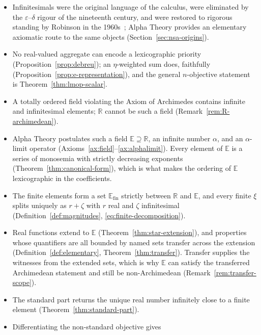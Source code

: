 \begin{itemize}
  \item Infinitesimals were the original language of the calculus, were eliminated by
        the $\varepsilon$--$\delta$ rigour of the nineteenth century, and were
        restored to rigorous standing by Robinson in the
        1960s~\cite{robinson1996nonstandard}; Alpha Theory provides an elementary
        axiomatic route to the same objects
        (Section~\ref{sec:nsa-origins}).
  \item No real-valued aggregate can encode a lexicographic priority
        (Proposition~\ref{prop:debreu}); an $\eta$-weighted sum does, faithfully
        (Proposition~\ref{prop:e-representation}), and the general $n$-objective
        statement is Theorem~\ref{thm:lmop-scalar}.
  \item A totally ordered field violating the Axiom of Archimedes contains infinite
        and infinitesimal elements; $\mathbb{R}$ cannot be such a field
        (Remark~\ref{rem:R-archimedean}).
  \item Alpha Theory postulates such a field $\mathbb{E} \supseteq \mathbb{R}$, an
        infinite number $\alpha$, and an $\alpha$-limit operator
        (Axioms~\ref{ax:field}--\ref{ax:alphalimit}). Every element of $\mathbb{E}$
        is a series of monosemia with strictly decreasing exponents
        (Theorem~\ref{thm:canonical-form}), which is what makes the ordering of
        $\mathbb{E}$ lexicographic in the coefficients.
  \item The finite elements form a set $\mathbb{E}_{\mathrm{fin}}$ strictly between
        $\mathbb{R}$ and $\mathbb{E}$, and every finite $\xi$ splits uniquely as
        $r+\zeta$ with $r$ real and $\zeta$ infinitesimal
        (Definition~\ref{def:magnitudes}, \eqref{eq:finite-decomposition}).
  \item Real functions extend to $\mathbb{E}$ (Theorem~\ref{thm:star-extension}), and
        properties whose quantifiers are all bounded by named sets transfer across
        the extension (Definition~\ref{def:elementary},
        Theorem~\ref{thm:transfer}). Transfer supplies the witnesses from the extended
        sets, which is why $\mathbb{E}$ can satisfy the transferred Archimedean
        statement and still be non-Archimedean (Remark~\ref{rem:transfer-scope}).
  \item The standard part returns the unique real number infinitely close to a finite
        element (Theorem~\ref{thm:standard-part}).
  \item Differentiating the non-standard objective gives

\end{itemize}
